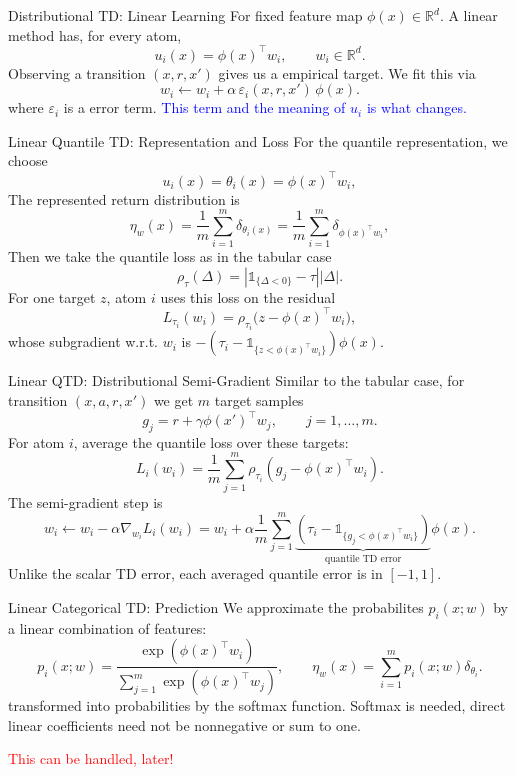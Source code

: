 \documentclass[10pt]{beamer}
\newcommand{\1}{\mathds{1}}
\begin{document}
\begin{frame}{Distributional TD: Linear Learning}
  For fixed feature map $\phi(x)\in\mathbb R^d$.
  A linear method has, for every atom,  
  \[
    u_i(x)=\phi(x)^\top w_i,\qquad w_i\in\mathbb R^d.
  \]
  Observing a transition $(x,r,x')$ gives us a empirical target. We fit this via 
  \[
    w_i \leftarrow w_i+\alpha\,\varepsilon_i(x,r,x')\,\phi(x).
  \]
   where $\varepsilon_i$ is a error term. \textcolor{blue}{This term and the meaning of $u_i$ is what changes.}
\end{frame}

\begin{frame}{Linear Quantile TD: Representation and Loss}
  For the quantile representation, we choose 
  \[
    u_i(x) = \theta_i(x) = \phi(x)^\top w_i,
  \]
  The represented return distribution is
  \[
    \eta_w(x)=\frac1m\sum_{i=1}^m\delta_{\theta_i(x)}
    =
    \frac1m\sum_{i=1}^m\delta_{\phi(x)^\top w_i},
  \]
  Then we take the quantile loss as in the tabular case
  \[
    \rho_\tau(\Delta)=\left|\1_{\{\Delta<0\}}-\tau\right||\Delta|.
  \]
  For one target $z$, atom $i$ uses this loss on the residual
  \[
    L_{\tau_i}(w_i)=\rho_{\tau_i}\bigl(z-\phi(x)^\top w_i\bigr),
  \]
  whose subgradient w.r.t. $w_i$ is
  $-(\tau_i-\1_{\{z<\phi(x)^\top w_i\}})\phi(x)$.
\end{frame}

\begin{frame}{Linear QTD: Distributional Semi-Gradient}
  Similar to the tabular case, for transition $(x,a,r,x')$ we get $m$ target samples
  \[
    g_j=r+\gamma\phi(x')^\top w_j,
    \qquad j=1,\ldots,m.
  \]
  For atom $i$, average the quantile loss over these targets:
  \[
    L_i(w_i)=\frac1m\sum_{j=1}^m
    \rho_{\tau_i}\left(g_j-\phi(x)^\top w_i\right).
  \]
  The semi-gradient step is
  \[
    w_i
    \leftarrow
    w_i-\alpha\nabla_{w_i}L_i(w_i)
    =
    w_i+\alpha\frac1m\sum_{j=1}^m
    \underbrace{\left(\tau_i-
    \1_{\{g_j<\phi(x)^\top w_i\}}\right)}_{\text{quantile TD error}}
    \phi(x).
  \]
  Unlike the scalar TD error, each averaged quantile error is in $ [-1,1]$.
\end{frame}

\begin{frame}{Linear Categorical TD: Prediction}
  We approximate the probabilites $p_i(x;w)$ by a linear combination of features:
  \[
    p_i(x;w)=
    \frac{\exp(\phi(x)^\top w_i)}
         {\sum_{j=1}^m\exp(\phi(x)^\top w_j)},
    \qquad
    \eta_w(x)=\sum_{i=1}^m p_i(x;w)\delta_{\theta_i}.
  \]
  transformed into probabilities by the softmax function. 
  Softmax is needed, direct linear coefficients need not be nonnegative or sum to one. 

  \pause 
  \begin{center}
      \textcolor{red}{This can be handled, later!}
        \end{center}

\end{frame}
\end{document}
